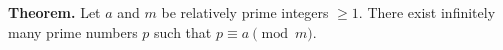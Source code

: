 \textbf{Theorem.} Let $a$ and $m$ be relatively prime integers $\geq 1$. There exist infinitely many prime numbers $p$ such that $p \equiv a \pmod{m}$.
